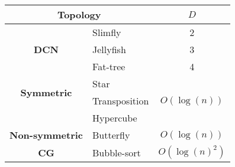 \begin{table}[h!]
    \begin{tabular}{|c| l |c|}
      \toprule
      \multicolumn{2}{|c|}{\textbf{Topology}}&\multirow{1}{*}{\textbf{$D$}}\\
      \midrule
      \multirow{3}{*}{\textbf{DCN}}&Slimfly & 2\\
      &Jellyfish & 3\\
      &Fat-tree &4\\
      \hline
      \multirow{2}{*}{\textbf{Symmetric}}&Star &\multirow{3}{*}{$O(\log(n))$}\\
      \multirow{2}{*}{\textbf{CG}}&Transposition & \\
      &Hypercube& \\
      \hline
      \multirow{1}{*}{\textbf{Non-symmetric}}&Butterfly&\multirow{1}{*}{$O(\log(n))$}\\
      \multirow{1}{*}{\textbf{CG}}&Bubble-sort& $O(\log(n)^2)$\\
      \bottomrule
    \end{tabular}
  \end{table}